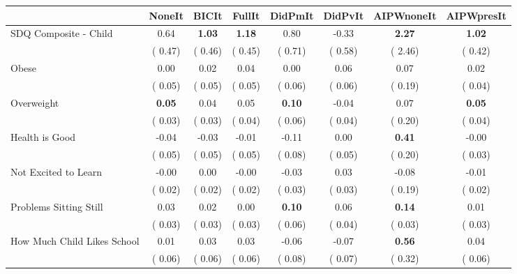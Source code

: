 \begin{tabular}{l c c c c c c c}
\toprule
 & NoneIt & BICIt & FullIt & DidPmIt & DidPvIt & AIPWnoneIt & AIPWpresIt \\
\midrule
SDQ Composite - Child &      0.64 & \textbf{      1.03 } & \textbf{      1.18 } &      0.80 &     -0.33 & \textbf{     2.27} & \textbf{     1.02} \\
& (     0.47) & (     0.46) & (     0.45) & (     0.71) & (     0.58) & (     2.46) & (     0.42) \\
Obese &      0.00 &      0.02 &      0.04 &      0.00 &      0.06 &      0.07 &      0.02 \\
& (     0.05) & (     0.05) & (     0.05) & (     0.06) & (     0.06) & (     0.19) & (     0.04) \\
Overweight & \textbf{      0.05 } &      0.04 &      0.05 & \textbf{      0.10 } &     -0.04 &      0.07 & \textbf{     0.05} \\
& (     0.03) & (     0.03) & (     0.04) & (     0.06) & (     0.04) & (     0.20) & (     0.04) \\
Health is Good &     -0.04 &     -0.03 &     -0.01 &     -0.11 &      0.00 & \textbf{     0.41} &     -0.00 \\
& (     0.05) & (     0.05) & (     0.05) & (     0.08) & (     0.05) & (     0.20) & (     0.03) \\
Not Excited to Learn &     -0.00 &      0.00 &     -0.00 &     -0.03 &      0.03 &     -0.08 &     -0.01 \\
& (     0.02) & (     0.02) & (     0.02) & (     0.03) & (     0.03) & (     0.19) & (     0.02) \\
Problems Sitting Still &      0.03 &      0.02 &      0.00 & \textbf{      0.10 } &      0.06 & \textbf{     0.14} &      0.01 \\
& (     0.03) & (     0.03) & (     0.03) & (     0.06) & (     0.04) & (     0.03) & (     0.03) \\
How Much Child Likes School &      0.01 &      0.03 &      0.03 &     -0.06 &     -0.07 & \textbf{     0.56} &      0.04 \\
& (     0.06) & (     0.06) & (     0.06) & (     0.08) & (     0.07) & (     0.32) & (     0.06) \\
\bottomrule
\end{tabular}
